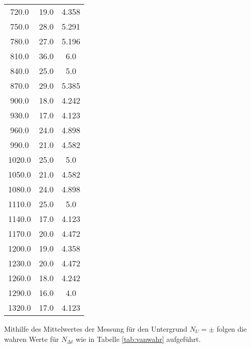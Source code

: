 \begin{table}
\begin{tabular}{S S S}
  720.0                & 19.0                 & 4.358  \\
  750.0                & 28.0                 & 5.291  \\
  780.0                & 27.0                 & 5.196  \\
  810.0                & 36.0                 & 6.0    \\
  840.0                & 25.0                 & 5.0    \\
  870.0                & 29.0                 & 5.385  \\
  900.0                & 18.0                 & 4.242  \\
  930.0                & 17.0                 & 4.123  \\
  960.0                & 24.0                 & 4.898  \\
  990.0                & 21.0                 & 4.582  \\
  1020.0               & 25.0                 & 5.0    \\
  1050.0               & 21.0                 & 4.582  \\
  1080.0               & 24.0                 & 4.898  \\
  1110.0               & 25.0                 & 5.0    \\
  1140.0               & 17.0                 & 4.123  \\
  1170.0               & 20.0                 & 4.472  \\
  1200.0               & 19.0                 & 4.358  \\
  1230.0               & 20.0                 & 4.472  \\
  1260.0               & 18.0                 & 4.242  \\
  1290.0               & 16.0                 & 4.0    \\
  1320.0               & 17.0                 & 4.123  
  \bottomrule
 \end{tabular}
\end{table}

\noindent Mithilfe des Mittelwertes der Messung für den Untergrund $N_U = \pm $
folgen die wahren Werte für $N_{\increment t}$ wie in Tabelle \ref{tab:vanwahr} 
aufgeführt.

